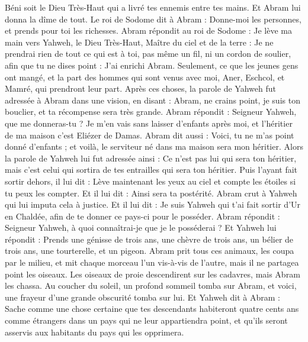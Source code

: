 \begin{multicols}{2}
Béni soit le Dieu Très-Haut qui a livré tes ennemis entre tes mains. Et Abram lui donna la dîme de tout.
Le roi de Sodome dit à Abram : Donne-moi les personnes, et prends pour toi les richesses.
Abram répondit au roi de Sodome : Je lève ma main vers Yahweh, le Dieu Très-Haut, Maître du ciel et de la terre :
Je ne prendrai rien de tout ce qui est à toi, pas même un fil, ni un cordon de soulier, afin que tu ne dises point : J'ai enrichi Abram.
Seulement, ce que les jeunes gens ont mangé, et la part des hommes qui sont venus avec moi, Aner, Eschcol, et Mamré, qui prendront leur part.
\VerseOne{}Après ces choses, la parole de Yahweh fut adressée à Abram dans une vision, en disant : Abram, ne crains point, je suis ton bouclier, et ta récompense sera très grande.
Abram répondit : Seigneur Yahweh, que me donneras-tu ? Je m'en vais sans laisser d'enfants après moi, et l’héritier de ma maison c'est Eliézer de Damas.
Abram dit aussi : Voici, tu ne m'as point donné d'enfants ; et voilà, le serviteur né dans ma maison sera mon héritier.
Alors la parole de Yahweh lui fut adressée ainsi : Ce n’est pas lui qui sera ton héritier, mais c’est celui qui sortira de tes entrailles qui sera ton héritier.
Puis l'ayant fait sortir dehors, il lui dit : Lève maintenant les yeux au ciel et compte les étoiles si tu peux les compter. Et il lui dit : Ainsi sera ta postérité.
Abram crut à Yahweh qui lui imputa cela à justice.
Et il lui dit : Je suis Yahweh qui t'ai fait sortir d'Ur en Chaldée, afin de te donner ce pays-ci pour le posséder.
Abram répondit : Seigneur Yahweh, à quoi connaîtrai-je que je le posséderai ?
Et Yahweh lui répondit : Prends une génisse de trois ans,  une chèvre de trois ans, un bélier de trois ans, une tourterelle, et un pigeon.
Abram prit tous ces animaux, les coupa par le milieu, et mit chaque morceau l’un vis-à-vis de l’autre, mais il ne partagea point les oiseaux.
Les oiseaux de proie descendirent sur les cadavres, mais Abram les chassa.
Au coucher du soleil, un profond sommeil tomba sur Abram, et voici, une frayeur d'une grande obscurité tomba sur lui.
Et Yahweh dit à Abram : Sache comme une chose certaine que tes descendants habiteront quatre cents ans comme étrangers dans un pays qui ne leur appartiendra point, et qu’ils seront asservis aux habitants du pays qui les opprimera.

\end{multicols}
